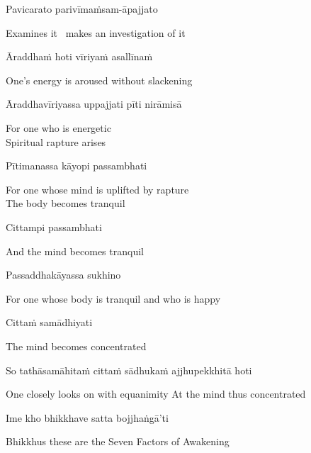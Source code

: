 Pavicarato parivīmaṁsam-āpajjato

\begin{cprenglish}
  Examines it \breathmark\ makes an investigation of it
\end{cprenglish}

Āraddhaṁ hoti vīriyaṁ asallīnaṁ

\begin{cprenglish}
  One’s energy is aroused without slackening
\end{cprenglish}

Āraddhavīriyassa uppajjati pīti nirāmisā

\begin{cprenglish}
  For one who is energetic\\
  Spiritual rapture arises
\end{cprenglish}

Pītimanassa kāyopi passambhati

\begin{cprenglish}
  For one whose mind is uplifted by rapture\\
  The body becomes tranquil
\end{cprenglish}

Cittampi passambhati

\begin{cprenglish}
  And the mind becomes tranquil
\end{cprenglish}

Passaddhakāyassa sukhino

\begin{cprenglish}
  For one whose body is tranquil and who is happy
\end{cprenglish}

Cittaṁ samādhiyati

\begin{cprenglish}
  The mind becomes concentrated
\end{cprenglish}

So tathāsamāhitaṁ cittaṁ sādhukaṁ ajjhupekkhitā hoti

\begin{cprenglish}
  One closely looks on with equanimity
  At the mind thus concentrated
\end{cprenglish}

\suttaRef{[SN 46.3]}

Ime kho bhikkhave satta bojjhaṅgā’ti

\begin{cprenglish}
  Bhikkhus these are the Seven Factors of Awakening
\end{cprenglish}

